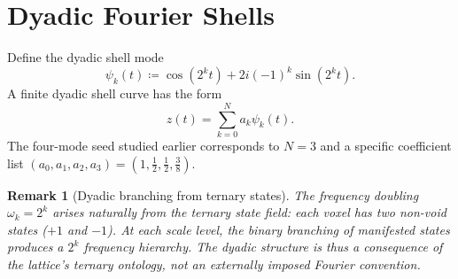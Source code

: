 \documentclass[11pt]{article}
\theoremstyle{tight}
\theoremstyle{plainroman}
\newtheorem{remark}[theorem]{Remark}
\begin{document}
\section{Dyadic Fourier Shells}

Define the dyadic shell mode
\[
\psi_k(t)\coloneqq \cos(2^k t)+2i(-1)^k\sin(2^k t).
\]
A finite dyadic shell curve has the form
\[
z(t)=\sum_{k=0}^{N} a_k\psi_k(t).
\]
The four-mode seed studied earlier corresponds to $N=3$ and a specific coefficient list $(a_0,a_1,a_2,a_3)=(1,\tfrac12,\tfrac12,\tfrac38)$.

\begin{remark}[Dyadic branching from ternary states]
The frequency doubling $\omega_k=2^k$ arises naturally from the ternary state field: each voxel has two non-void states ($+1$ and $-1$).
At each scale level, the binary branching of manifested states produces a $2^k$ frequency hierarchy.
The dyadic structure is thus a consequence of the lattice's ternary ontology, not an externally imposed Fourier convention.
\end{remark}
\end{document}
